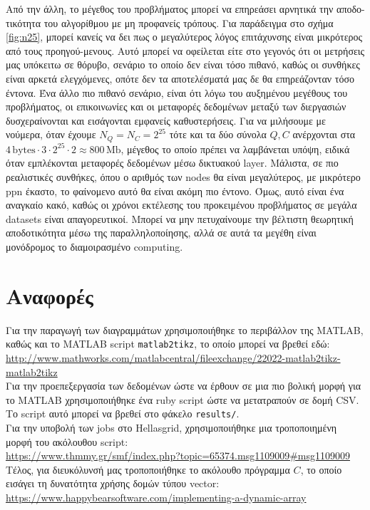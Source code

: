\documentclass[11pt,a4paper,titlepage]{article}
\begin{document}
	Από την άλλη, το μέγεθος του προβλήματος μπορεί να επηρεάσει αρνητικά την αποδο-τικότητα του αλγορίθμου με μη προφανείς τρόπους. Για παράδειγμα στο σχήμα \ref{fig:n25}, μπορεί κανείς να δει πως ο μεγαλύτερος λόγος επιτάχυνσης είναι μικρότερος από τους προηγού-μενους. Αυτό μπορεί να οφείλεται είτε στο γεγονός ότι οι μετρήσεις μας υπόκειτω σε θόρυβο, σενάριο το οποίο δεν είναι τόσο πιθανό, καθώς οι συνθήκες είναι αρκετά ελεγχόμενες, οπότε δεν τα αποτελέσματά μας δε θα επηρεάζονταν τόσο έντονα. Ένα άλλο πιο πιθανό σενάριο, είναι ότι λόγω του αυξημένου μεγέθους του προβλήματος, οι επικοινωνίες και οι μεταφορές δεδομένων μεταξύ των διεργασιών δυσχεραίνονται και εισάγονται εμφανείς καθυστερήσεις. Για να μιλήσουμε με νούμερα, όταν έχουμε $N_Q = N_C = 2^{25}$ τότε και τα δύο σύνολα $Q, C$ ανέρχονται στα $4\, \mathrm{bytes}\cdot3\cdot2^{25}\cdot2 \approx 800\, \mathrm{Mb}$, μέγεθος το οποίο πρέπει να λαμβάνεται υπόψη, ειδικά όταν εμπλέκονται μεταφορές δεδομένων μέσω δικτυακού layer. Μάλιστα, σε πιο ρεαλιστικές συνθήκες, όπου ο αριθμός των nodes θα είναι μεγαλύτερος, με μικρότερο ppn έκαστο, το φαίνομενο αυτό θα είναι ακόμη πιο έντονο. Όμως, αυτό είναι ένα αναγκαίο κακό, καθώς οι χρόνοι εκτέλεσης του προκειμένου προβλήματος σε μεγάλα datasets είναι απαγορευτικοί. Μπορεί να μην πετυχαίνουμε την βέλτιστη θεωρητική αποδοτικότητα μέσω της παραλληλοποίησης, αλλά σε αυτά τα μεγέθη είναι μονόδρομος το διαμοιρασμένο computing.\\
	
\section{Αναφορές}
	Για την παραγωγή των διαγραμμάτων χρησιμοποιήθηκε το περιβάλλον της MATLAB, καθώς και το MATLAB script \verb|matlab2tikz|, το οποίο μπορεί να βρεθεί εδώ:\\ \url{http://www.mathworks.com/matlabcentral/fileexchange/22022-matlab2tikz-matlab2tikz}\\
	
	Για την προεπεξεργασία των δεδομένων ώστε να έρθουν σε μια πιο βολική μορφή για το MATLAB χρησιμοποιήθηκε ένα ruby script ώστε να μετατραπούν σε δομή CSV. Το script αυτό μπορεί να βρεθεί στο φάκελο \verb|results/|.\\
	
	Για την υποβολή των jobs στο Hellasgrid, χρησιμοποιήθηκε μια τροποποιημένη μορφή του ακόλουθου script:\\
	 \url{https://www.thmmy.gr/smf/index.php?topic=65374.msg1109009#msg1109009}\\
	 
	Τέλος, για διευκόλυνσή μας τροποποιήθηκε το ακόλουθο πρόγραμμα $C$, το οποίο εισάγει τη δυνατότητα χρήσης δομών τύπου vector:\\
	\url{https://www.happybearsoftware.com/implementing-a-dynamic-array}
\end{document}

